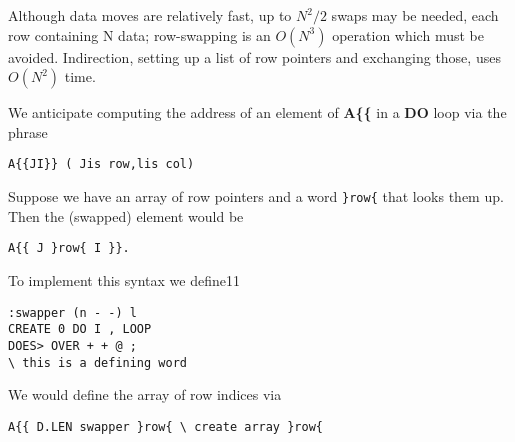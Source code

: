 Although data moves are relatively fast, up to $N^2/2$ swaps may be
needed, each row containing N data; row-swapping is an $O(N^3)$
operation which must be avoided. Indirection, setting up a list of
row pointers and exchanging those, uses $O(N^2)$ time.


We anticipate computing the address of an element of \textbf{A\{\{} in a
\textbf{DO} loop via the phrase 

\begin{verbatim}
A{{JI}} ( Jis row,lis col)
\end{verbatim}

Suppose we have an array of row pointers and a word \verb|}row{| that
looks them up. Then the (swapped) element would be

\begin{verbatim}
A{{ J }row{ I }}.
\end{verbatim}

To implement this syntax we define11

\begin{verbatim}
:swapper (n - -) l
CREATE 0 DO I , LOOP
DOES> OVER + + @ ;
\ this is a defining word
\end{verbatim}
 
We would define the array of row indices via

\begin{verbatim}
A{{ D.LEN swapper }row{ \ create array }row{
\end{verbatim}

